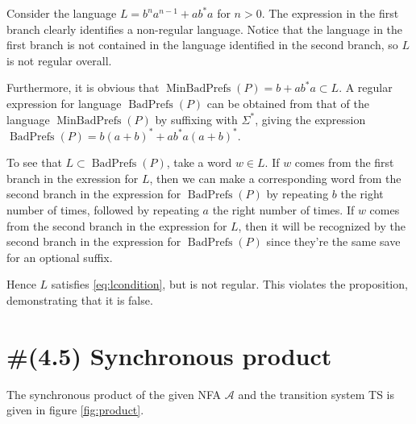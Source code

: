 \documentclass[letterpaper,11pt]{article}
\DeclareMathOperator{\MBP}{MinBadPrefs}
\DeclareMathOperator{\BP}{BadPrefs}
\begin{document}
Consider the language
$L = b^na^{n-1} + a b^* a$ for $n > 0$.
The expression in the first branch clearly identifies a non-regular language.
Notice that the language in the first branch is not contained in the language
identified in the second branch, so $L$ is not regular overall.

Furthermore, it is obvious that $\MBP(P) = b + a b^* a \subset L$.
A regular expression for language $\BP(P)$ can be obtained from that of the
language $\MBP(P)$ by suffixing with $\Sigma^*$, giving the expression
$\BP(P) = b(a+b)^* + a b^* a (a+b)^*$.

To see that  $L \subset \BP(P)$, take a word $w \in L$. If $w$ comes from the
first branch in the exression for $L$, then we can make a corresponding word
from the second branch in the expression for $\BP(P)$ by repeating $b$ the
right number of times, followed by repeating $a$ the right number of times.
If $w$ comes from the second branch in the expression for $L$, then it will be
recognized by the second branch in the expression for $\BP(P)$ since they're
the same save for an optional suffix.

Hence $L$ satisfies \eqref{eq:lcondition}, but is not regular. This violates
the proposition, demonstrating that it is false.

\section{\#(4.5) Synchronous product}

The synchronous product of the given NFA $\mathcal{A}$ and the transition
system TS is given in figure \ref{fig:product}.
\end{document}
